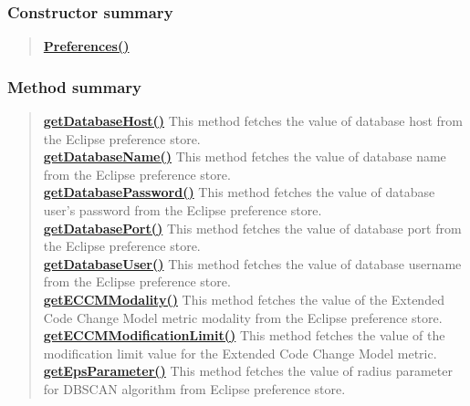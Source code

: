 {{{{{{{{\subsubsection{Constructor summary}{
\begin{verse}
\hyperlink{it.unisa.sesa.repominer.preferences.Preferences()}{{\bf Preferences()}} \\
\end{verse}
}
\subsubsection{Method summary}{
\begin{verse}
\hyperlink{it.unisa.sesa.repominer.preferences.Preferences.getDatabaseHost()}{{\bf getDatabaseHost()}} This method fetches the value of database host from the Eclipse preference store.\\
\hyperlink{it.unisa.sesa.repominer.preferences.Preferences.getDatabaseName()}{{\bf getDatabaseName()}} This method fetches the value of database name from the Eclipse preference store.\\
\hyperlink{it.unisa.sesa.repominer.preferences.Preferences.getDatabasePassword()}{{\bf getDatabasePassword()}} This method fetches the value of database user's password from the Eclipse preference store.\\
\hyperlink{it.unisa.sesa.repominer.preferences.Preferences.getDatabasePort()}{{\bf getDatabasePort()}} This method fetches the value of database port from the Eclipse preference store.\\
\hyperlink{it.unisa.sesa.repominer.preferences.Preferences.getDatabaseUser()}{{\bf getDatabaseUser()}} This method fetches the value of database username from the Eclipse preference store.\\
\hyperlink{it.unisa.sesa.repominer.preferences.Preferences.getECCMModality()}{{\bf getECCMModality()}} This method fetches the value of the Extended Code Change Model metric modality from the Eclipse preference store.\\
\hyperlink{it.unisa.sesa.repominer.preferences.Preferences.getECCMModificationLimit()}{{\bf getECCMModificationLimit()}} This method fetches the value of the modification limit value for the Extended Code Change Model metric.\\
\hyperlink{it.unisa.sesa.repominer.preferences.Preferences.getEpsParameter()}{{\bf getEpsParameter()}} This method fetches the value of radius parameter for DBSCAN algorithm from Eclipse preference store.\\

\end{verse}}}}}}}}}}
